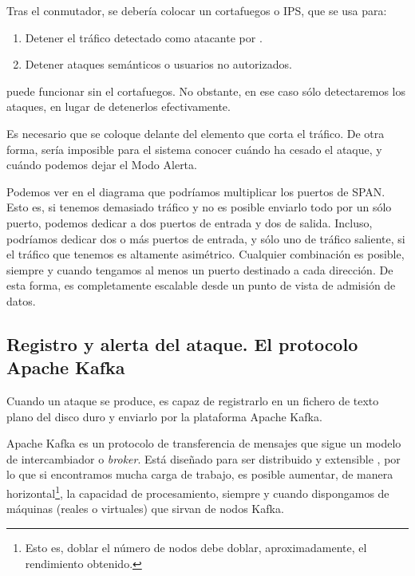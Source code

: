Tras el conmutador, se debería colocar un cortafuegos o \gls{IPS}, que se usa para:
\begin{enumerate}
 \item Detener el tráfico detectado como atacante por \redborderddos.
 \item Detener ataques semánticos o usuarios no autorizados.
\end{enumerate}

\redborderddos{} puede funcionar sin el cortafuegos. No obstante, en ese caso sólo detectaremos los 
ataques, en lugar de detenerlos efectivamente.

Es necesario que \redborderddos{} se coloque delante del elemento que corta el tráfico. De otra forma, sería imposible 
para el sistema conocer cuándo ha cesado el ataque, y cuándo podemos dejar el Modo Alerta.

Podemos ver en el diagrama que podríamos multiplicar los puertos de SPAN. Esto es, si tenemos demasiado tráfico y no es 
posible enviarlo todo por un sólo puerto, podemos dedicar a \redborderddos{} dos puertos de entrada y dos de salida. 
Incluso, podríamos dedicar dos o más puertos de entrada, y sólo uno de tráfico saliente, si el tráfico que tenemos es 
altamente asimétrico. Cualquier combinación es posible, siempre y cuando tengamos al menos un puerto destinado a cada 
dirección. De esta forma, \redborderddos{} es completamente escalable desde un punto de vista de admisión de datos.

\subsection{Registro y alerta del ataque. El protocolo Apache Kafka}
Cuando un ataque se produce, \redborderddos{} es capaz de registrarlo en un fichero de texto plano del disco duro y 
enviarlo por la plataforma Apache Kafka.

Apache Kafka es un protocolo de transferencia de mensajes que sigue un modelo de intercambiador o 
\emph{broker}. Está diseñado para ser distribuido y extensible \cite{ApacheKafka}, por lo que si 
encontramos mucha carga de trabajo, es posible aumentar, de manera horizontal\footnote{Esto es, doblar el número de 
nodos debe doblar, aproximadamente, el rendimiento obtenido.}, la capacidad de procesamiento, siempre y cuando 
dispongamos de máquinas (reales o virtuales) que sirvan de nodos Kafka.

